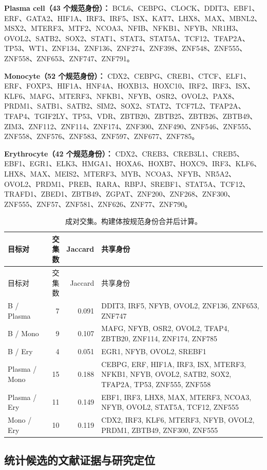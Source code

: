 \noindent\textbf{Plasma cell（43 个规范身份）：} BCL6、CEBPG、CLOCK、DDIT3、EBF1、ERF、GATA2、HIF1A、IRF3、IRF5、ISX、KAT7、LHX8、MAX、MBNL2、MSX2、MTERF3、MTF2、NCOA3、NFIB、NFKB1、NFYB、NR1H3、OVOL2、SATB2、SOX2、STAT1、STAT3、STAT5A、TCF12、TFAP2A、TP53、WT1、ZNF134、ZNF136、ZNF274、ZNF398、ZNF548、ZNF555、ZNF558、ZNF653、ZNF747、ZNF791。\par\medskip
\noindent\textbf{Monocyte（52 个规范身份）：} CDX2、CEBPG、CREB1、CTCF、ELF1、ERF、FOXP3、HIF1A、HNF4A、HOXB13、HOXC10、IRF2、IRF3、ISX、KLF6、MAFG、MTERF3、NFKB1、NFYB、OSR2、OVOL2、PAX8、PRDM1、SATB1、SATB2、SIM2、SOX2、STAT2、TCF7L2、TFAP2A、TFAP4、TGIF2LY、TP53、VDR、ZBTB20、ZBTB25、ZBTB26、ZBTB49、ZIM3、ZNF112、ZNF114、ZNF174、ZNF300、ZNF490、ZNF546、ZNF555、ZNF558、ZNF576、ZNF583、ZNF597、ZNF677、ZNF785。\par\medskip
\noindent\textbf{Erythrocyte（42 个规范身份）：} CDX2、CREB3、CREB3L1、CREB5、EBF1、EGR1、ELK3、HMGA1、HOXA6、HOXB7、HOXC9、IRF3、KLF6、LHX8、MAX、MEIS2、MTERF3、MYB、NCOA3、NFYB、NR5A2、OVOL2、PRDM1、PREB、RARA、RBPJ、SREBF1、STAT5A、TCF12、TRAFD1、ZBED1、ZBTB49、ZGPAT、ZNF200、ZNF268、ZNF300、ZNF555、ZNF57、ZNF581、ZNF626、ZNF77、ZNF790。\par\medskip
{\footnotesize\linespread{1}\selectfont\setlength{\tabcolsep}{4pt}\renewcommand{\arraystretch}{1.08}\begin{longtable}{lrrp{10cm}}\caption{成对交集。构建体按规范身份合并后计算。}\\\toprule 目标对 & 交集数 & Jaccard & 共享身份\\\midrule\endfirsthead\toprule 目标对 & 交集数 & Jaccard & 共享身份\\\midrule\endhead
B / Plasma & 7 & 0.091 & DDIT3, IRF5, NFYB, OVOL2, ZNF136, ZNF653, ZNF747\\
B / Mono & 9 & 0.107 & MAFG, NFYB, OSR2, OVOL2, TFAP4, ZBTB20, ZNF114, ZNF174, ZNF785\\
B / Ery & 4 & 0.051 & EGR1, NFYB, OVOL2, SREBF1\\
Plasma / Mono & 15 & 0.188 & CEBPG, ERF, HIF1A, IRF3, ISX, MTERF3, NFKB1, NFYB, OVOL2, SATB2, SOX2, TFAP2A, TP53, ZNF555, ZNF558\\
Plasma / Ery & 11 & 0.149 & EBF1, IRF3, LHX8, MAX, MTERF3, NCOA3, NFYB, OVOL2, STAT5A, TCF12, ZNF555\\
Mono / Ery & 10 & 0.119 & CDX2, IRF3, KLF6, MTERF3, NFYB, OVOL2, PRDM1, ZBTB49, ZNF300, ZNF555\\
\bottomrule\end{longtable}}
\clearpage\subsection{统计候选的文献证据与研究定位}
